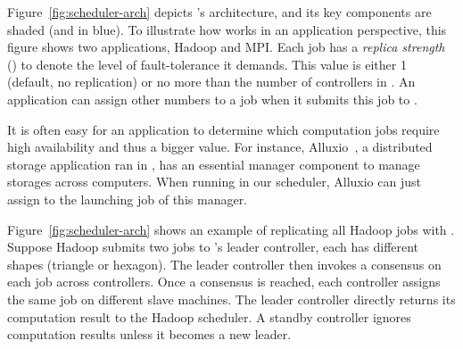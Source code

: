 



Figure~\ref{fig:scheduler-arch} depicts \tripod's architecture, and its key 
components are shaded (and in blue). To illustrate how \tripod works in an 
application perspective, this figure shows two applications, Hadoop and MPI. 
Each job has a \emph{replica strength} () to denote the level of 
fault-tolerance it demands. This  value is either 1 (default, no 
replication) or no more than the number of controllers in \tripod. An 
application can assign other  numbers to a job when it submits this job to 
\tripod.

It is often easy for an application to determine which computation jobs require 
high availability and thus a bigger  value. For instance, 
Alluxio~\cite{alluxio}, a distributed storage application ran in \mesos, has 
an essential manager component to manage storages across computers. When 
running in our \tripod scheduler, Alluxio can just assign  to the 
launching job of this manager.


Figure~\ref{fig:scheduler-arch} shows an example of replicating all Hadoop jobs 
with . Suppose Hadoop submits two jobs to \tripod's leader controller, 
each has different shapes (triangle or hexagon). The leader controller then 
invokes a consensus on each job across controllers. Once a consensus is reached, 
each controller assigns the same job on different slave machines. The leader 
controller directly returns its computation result to the Hadoop scheduler. 
A standby controller ignores computation results unless it becomes a new leader.

